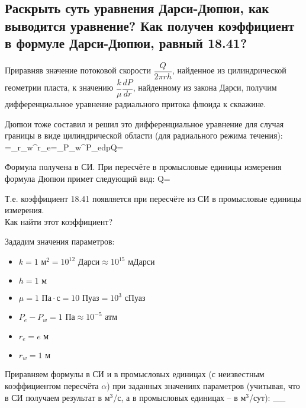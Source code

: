 

\subsection{Раскрыть суть уравнения Дарси-Дюпюи, как выводится уравнение? Как получен коэффициент в формуле Дарси-Дюпюи, равный 18.41?}

Приравняв значение потоковой скорости $\dfrac{Q}{2\pi rh}$, найденное из цилиндрической геометрии пласта, к значению $\dfrac{k}{\mu}\dfrac{dP}{dr}$, найденному из закона Дарси, получим дифференциальное уравнение радиального притока флюида к скважине.

Дюпюи тоже составил и решил это дифференциальное уравнение для случая границы в виде цилиндрической области (для радиального режима течения):
\beq\label{DupuyExam}
=\Rightarrow{}\int\limits_{r_w}^{r_e}{}=\int\limits_{P_w}^{P_e}{dp}\Rightarrow Q=
\eeq

Формула получена в СИ.
При пересчёте в промысловые единицы измерения формула Дюпюи примет следующий вид:
\beq
Q=\,
\eeq

Т.е. коэффициент 18.41 появляется при пересчёте из СИ в промысловые единицы измерения.
\\

Как найти этот коэффициент?

Зададим значения параметров:
\begin{itemize}[parsep=-5pt]
	\item $k=1\text{ м}^2=10^{12}\text{ Дарси}\approx10^{15}\text{ мДарси}$
	\item $h=1\text{ м}$
	\item $\mu=1\text{ Па}\cdot\text{с}=10\text{ Пуаз}=10^3\text{ сПуаз}$
	\item $P_e-P_w=1\text{ Па}\approx10^{-5}\text{ атм}$
	\item $r_e=e\text{ м}$
	\item $r_w=1\text{ м}$
\end{itemize}

Приравняем формулы в СИ и в промысловых единицах (с неизвестным коэффициентом пересчёта $\alpha$) при заданных значениях параметров (учитывая, что в СИ получаем результат в м$^3$/с, а в промысловых единицах -- в м$^3$/сут):
\cdot{}_{}\approx{}_{}
\eeq

